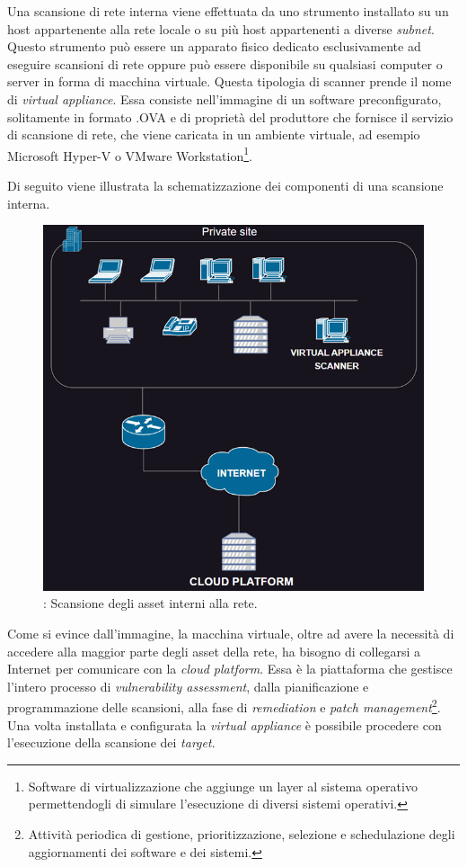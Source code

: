 \documentclass[target=bach,aauheader=]{thud}
\begin{document}
Una scansione di rete interna viene effettuata da uno strumento installato su un host appartenente alla rete locale o su più host appartenenti a diverse \textit{subnet}. Questo strumento può essere un apparato fisico dedicato esclusivamente ad eseguire scansioni di rete oppure può essere disponibile su qualsiasi computer o server in forma di macchina virtuale. Questa tipologia di scanner prende il nome di \textit{virtual appliance}. Essa consiste nell’immagine di un software preconfigurato, solitamente in formato .OVA e di proprietà del produttore che fornisce il servizio di scansione di rete, che viene caricata in un ambiente virtuale, ad esempio Microsoft Hyper-V o VMware Workstation\footnote{Software di virtualizzazione che aggiunge un layer al sistema operativo permettendogli di simulare l’esecuzione di diversi sistemi operativi.}.

Di seguito viene illustrata la schematizzazione dei componenti di una scansione interna.

\begin{figure}[h]

\centering
\includegraphics{images/scan_interna.png}
    \caption{: Scansione degli asset interni alla rete.}
    \label{fig:scan_interna}
\end{figure}


Come si evince dall’immagine, la macchina virtuale, oltre ad avere la necessità di accedere alla maggior parte degli asset della rete, ha bisogno di collegarsi a Internet per comunicare con la \textit{cloud platform}. Essa è la piattaforma che gestisce l’intero processo di \textit{vulnerability assessment}, dalla pianificazione e programmazione delle scansioni, alla fase di \textit{remediation} e \textit{patch management}\footnote{Attività periodica di gestione, prioritizzazione, selezione e schedulazione degli aggiornamenti dei software e dei sistemi.}. Una volta installata e configurata la \textit{virtual appliance} è possibile procedere con l’esecuzione della scansione dei \textit{target}.
\end{document}
